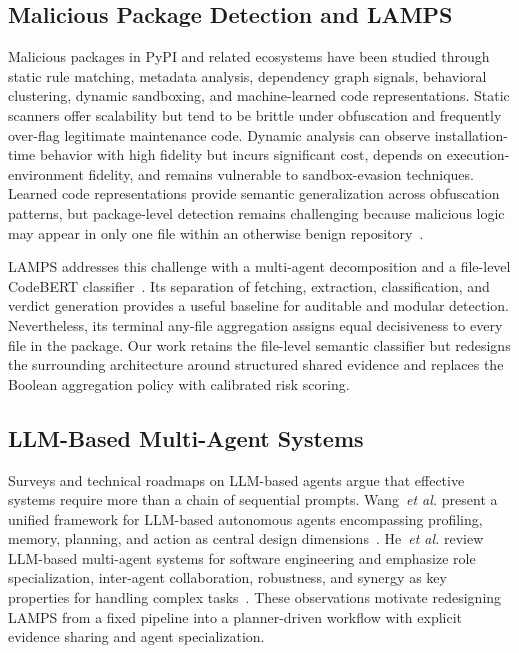 \documentclass[conference,a4paper]{IEEEtran}
\newcommand{\codebert}{CodeBERT}
\begin{document}
\subsection{Malicious Package Detection and LAMPS}
Malicious packages in PyPI and related ecosystems have been studied through static
rule matching, metadata analysis, dependency graph signals, behavioral clustering,
dynamic sandboxing, and machine-learned code representations. Static scanners offer
scalability but tend to be brittle under obfuscation and frequently over-flag legitimate
maintenance code. Dynamic analysis can observe installation-time behavior with high
fidelity but incurs significant cost, depends on execution-environment fidelity, and
remains vulnerable to sandbox-evasion techniques. Learned code representations provide
semantic generalization across obfuscation patterns, but package-level detection remains
challenging because malicious logic may appear in only one file within an otherwise
benign repository~\cite{pypimalware}.

LAMPS addresses this challenge with a multi-agent decomposition and a file-level
\codebert{} classifier~\cite{lamps}. Its separation of fetching, extraction, classification,
and verdict generation provides a useful baseline for auditable and modular detection.
Nevertheless, its terminal any-file aggregation assigns equal decisiveness to every file
in the package. Our work retains the file-level semantic classifier but redesigns the
surrounding architecture around structured shared evidence and replaces the Boolean
aggregation policy with calibrated risk scoring.

\subsection{LLM-Based Multi-Agent Systems}
Surveys and technical roadmaps on LLM-based agents argue that effective systems require
more than a chain of sequential prompts. Wang~\emph{et al.} present a unified framework
for LLM-based autonomous agents encompassing profiling, memory, planning, and
action as central design dimensions~\cite{wang2024agents}. He~\emph{et al.} review
LLM-based multi-agent systems for software engineering and emphasize role
specialization, inter-agent collaboration, robustness, and synergy as key properties for
handling complex tasks~\cite{he2025lma}. These observations motivate redesigning LAMPS
from a fixed pipeline into a planner-driven workflow with explicit evidence sharing and
agent specialization.
\end{document}
